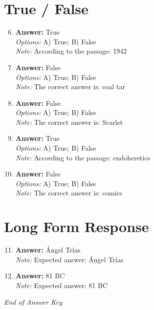\documentclass[12pt]{article}
\begin{document}
\section*{True / False}
\begin{enumerate}[label=\arabic*.]
\setcounter{enumi}{5}
\item \textbf{Answer:} True
\\ \textit{Options:} A) True; B) False
\\ \textit{Note:} According to the passage: 1942
\item \textbf{Answer:} False
\\ \textit{Options:} A) True; B) False
\\ \textit{Note:} The correct answer is: coal tar
\item \textbf{Answer:} False
\\ \textit{Options:} A) True; B) False
\\ \textit{Note:} The correct answer is: Scarlet
\item \textbf{Answer:} True
\\ \textit{Options:} A) True; B) False
\\ \textit{Note:} According to the passage: endoheretics
\item \textbf{Answer:} False
\\ \textit{Options:} A) True; B) False
\\ \textit{Note:} The correct answer is: comics
\end{enumerate}

\section*{Long Form Response}
\begin{enumerate}[label=\arabic*.]
\setcounter{enumi}{10}
\item \textbf{Answer:} Ángel Trías
\\ \textit{Note:} Expected answer: Ángel Trías
\item \textbf{Answer:} 81 BC
\\ \textit{Note:} Expected answer: 81 BC
\end{enumerate}

\vfill
\noindent\textit{End of Answer Key}
\end{document}

